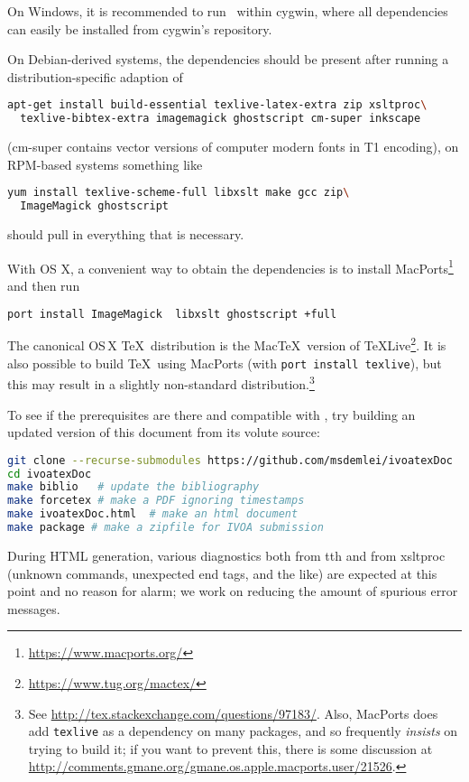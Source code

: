 \documentclass[11pt,a4paper]{ivoa}
\begin{document}
On Windows, it is recommended to run \ivoatex\ within cygwin, where all
dependencies can easily be installed from cygwin's repository.  

On
Debian-derived systems, the dependencies should be present after
running a distribution-specific adaption of
\begin{lstlisting}[language=sh,basicstyle=\footnotesize]
apt-get install build-essential texlive-latex-extra zip xsltproc\
  texlive-bibtex-extra imagemagick ghostscript cm-super inkscape
\end{lstlisting}
(cm-super contains vector versions of computer modern fonts in T1
encoding), on RPM-based systems something like
\begin{lstlisting}[language=sh]
yum install texlive-scheme-full libxslt make gcc zip\
  ImageMagick ghostscript
\end{lstlisting}
should pull in everything that is necessary.

With OS X, a convenient way to obtain the dependencies is to install
MacPorts\footnote{\url{https://www.macports.org/}} and then run
\begin{lstlisting}[language=sh]
port install ImageMagick  libxslt ghostscript +full
\end{lstlisting}
The canonical OS\,X \TeX\ distribution is the Mac\TeX\ version of
\TeX Live\footnote{\url{https://www.tug.org/mactex/}}.  It is also
possible to build \TeX\ using MacPorts (with \texttt{port install
  texlive}), but this may result in a slightly non-standard
distribution.\footnote{See
  \url{http://tex.stackexchange.com/questions/97183/}.
  Also, MacPorts does add
  \texttt{texlive} as a dependency on many packages, and so frequently
  \emph{insists} on trying to build it; if you want to prevent this,
  there is some discussion at
  \url{http://comments.gmane.org/gmane.os.apple.macports.user/21526}.}

To see if the prerequisites are there and compatible with \ivoatex, try
building an updated version of this document from its volute source:
\begin{lstlisting}[language=sh,basicstyle=\footnotesize]
git clone --recurse-submodules https://github.com/msdemlei/ivoatexDoc
cd ivoatexDoc
make biblio   # update the bibliography
make forcetex # make a PDF ignoring timestamps
make ivoatexDoc.html  # make an html document
make package # make a zipfile for IVOA submission
\end{lstlisting}

During HTML generation, various diagnostics both 
from tth and from xsltproc (unknown commands,
unexpected end tags, and the like) are
expected at this point and no reason for alarm; we work on reducing the
amount of spurious error messages.
\end{document}

